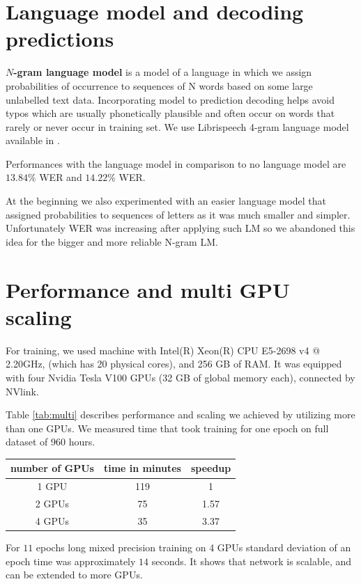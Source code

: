 \documentclass[licencjacka,en]{pracamgr}
\begin{document}
    
    	\section{Language model and decoding predictions}
	\textbf{$N$-gram language model} is a model of a language in which we assign probabilities of occurrence to sequences of N words based on some large unlabelled text data. Incorporating model to prediction decoding helps avoid typos which are usually phonetically plausible and often occur on words that rarely or never occur in training set. We use Librispeech 4-gram language model available in \cite{LM-LINK}.
	
	Performances with the language model in comparison to no language model are $13.84$\% WER and $14.22$\% WER.
	
	At the beginning we also experimented with an easier language model that assigned probabilities to sequences of letters as it was much smaller and simpler. Unfortunately WER was increasing after applying such LM so we abandoned this idea for the bigger and more reliable N-gram LM.
	
	
    	\section{Performance and multi GPU scaling}
	For training, we used machine with Intel(R) Xeon(R) CPU E5-2698 v4 @ 2.20GHz, (which has 20 physical cores), and 256 GB of RAM. It was equipped with four Nvidia Tesla V100 GPUs (32 GB of global memory each), connected by NVlink.
	
	Table \ref{tab:multi} describes performance and scaling we achieved by utilizing more than one GPUs. We measured time that took training for one epoch on full dataset of 960 hours.
	
	{
		\centering
		\begin{tabular}{|c|c|c|}
			\hline
			number of GPUs & time in minutes & speedup \\
			\hline
			1 GPU & 119 & 1 \\
			\hline
			2 GPUs & 75 & 1.57 \\
			\hline
			4 GPUs & 35 & 3.37 \\
			\hline
		\end{tabular}
		\label{tab:multi}
	}
	
	For $11$ epochs long mixed precision training on 4 GPUs standard deviation of an epoch time was approximately $14$ seconds. It shows that network is scalable, and can be extended to more GPUs.
    
\end{document}
